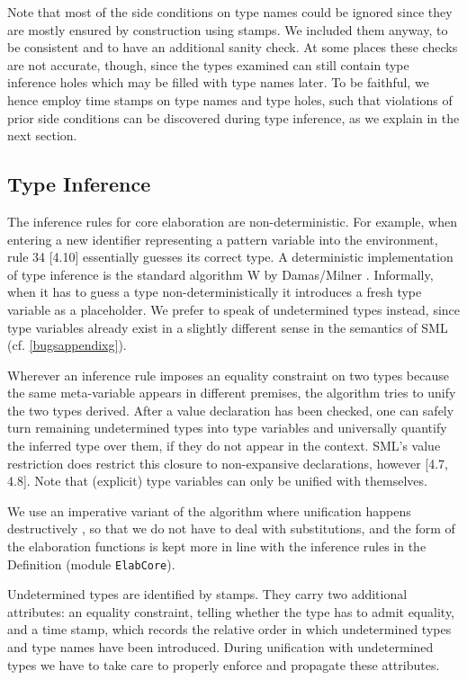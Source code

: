 \documentclass[twoside,titlepage]{article}
\begin{document}
Note that most of the side conditions on type names could be ignored since they are mostly ensured by construction using stamps. We included them anyway, to be consistent and to have an additional sanity check. At some places these checks are not accurate, though, since the types examined can still contain type inference holes which may be filled with type names later. To be faithful, we hence employ time stamps on type names and type holes, such that violations of prior side conditions can be discovered during type inference, as we explain in the next section.


\subsection{Type Inference}
\label{typeinference}

The inference rules for core elaboration are non-deterministic. For example, when entering a new identifier representing a pattern variable into the environment, rule 34 [4.10] essentially guesses its correct type. A deterministic implementation of type inference is the standard algorithm W by Damas/Milner \cite{principal}. Informally, when it has to guess a type non-deterministically it introduces a fresh type variable as a placeholder. We prefer to speak of undetermined types instead, since type variables already exist in a slightly different sense in the semantics of SML (cf. \ref{bugsappendixg}).

Wherever an inference rule imposes an equality constraint on two types because the same meta-variable appears in different premises, the algorithm tries to unify the two types derived. After a value declaration has been checked, one can safely turn remaining undetermined types into type variables and universally quantify the inferred type over them, if they do not appear in the context. SML's value restriction does restrict this closure to non-expansive declarations, however [4.7, 4.8]. Note that (explicit) type variables can only be unified with themselves.

We use an imperative variant of the algorithm where unification happens destructively \cite{typechecking}, so that we do not have to deal with substitutions, and the form of the elaboration functions is kept more in line with the inference rules in the Definition (module {\tt ElabCore}).

Undetermined types are identified by stamps. They carry two additional attributes: an equality constraint, telling whether the type has to admit equality, and a time stamp, which records the relative order in which undetermined types and type names have been introduced. During unification with undetermined types we have to take care to properly enforce and propagate these attributes.
\end{document}
